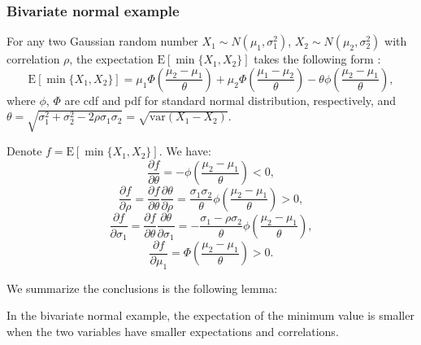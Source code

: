 \documentclass[opre,sglanonrev]{informs4}
\begin{document}
\subsubsection{Bivariate normal example}
\label{bivariate normal}

For any two Gaussian random number $X_1\sim N(\mu_1,\sigma^2_1)$, $X_2\sim N(\mu_2,\sigma^2_2)$ with correlation $\rho$, the expectation $\text{E}[\min\{X_1, X_2\}]$ takes the following form \citep{clark1961greatest}:
$$
\text{E}[\min\{X_1, X_2\}] = \mu_1\Phi(\frac{\mu_2-\mu_1}{\theta}) + \mu_2\Phi(\frac{\mu_1-\mu_2}{\theta}) - \theta \phi(\frac{\mu_2-\mu_1}{\theta} ),
$$
where $\phi$, $\Phi$ are cdf and pdf for standard normal distribution, respectively, and $\theta = \sqrt{\sigma^2_1+\sigma^2_2-2\rho \sigma_1\sigma_2} = \sqrt{\text{var}(X_1-X_2)}$.

Denote $f=\text{E}[\min\{X_1, X_2\}] $. We have:
\begin{equation}
	\frac{\partial f}{\partial \theta} = -\phi(\frac{\mu_2-\mu_1}{\theta})<0,
\end{equation}
\begin{equation}
	\label{rho}
	\frac{\partial f}{\partial \rho} = \frac{\partial f}{\partial \theta} \frac{\partial \theta}{\partial \rho} =  \frac{\sigma_1\sigma_2}{\theta}\phi(\frac{\mu_2-\mu_1}{\theta})>0,
\end{equation}
\begin{equation}
	\label{sigma}
	\frac{\partial f}{\partial \sigma_1} = \frac{\partial f}{\partial \theta} \frac{\partial \theta}{\partial \sigma_1} = -\frac{\sigma_1-\rho\sigma_2}{\theta} \phi(\frac{\mu_2-\mu_1}{\theta}),
\end{equation}
\begin{equation}
	\label{mu}
	\frac{\partial f}{\partial \mu_1} = \Phi( \frac{\mu_2-\mu_1}{\theta})>0.
\end{equation}

We summarize the conclusions is the following lemma:
\begin{lemma}
	In the bivariate normal example, the expectation of the minimum value is smaller when the two variables have smaller expectations and correlations.
\end{lemma}
\end{document}
